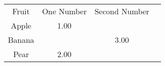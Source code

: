 \begin{tabular}{cccc}
Fruit&One Number&Second Number&\\
Apple&      1.00&&\\
Banana&&      3.00&\\
Pear&      2.00&&
\end{tabular}
